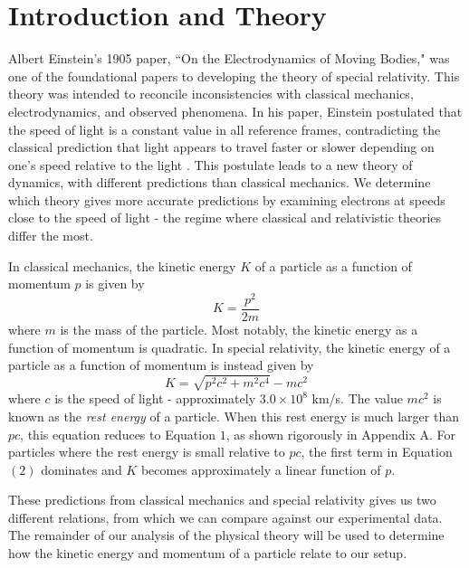 \section{Introduction and Theory}
Albert Einstein's 1905 paper, ``On the Electrodynamics of Moving Bodies," was one of the foundational papers to developing the theory of special relativity. This theory was intended to reconcile inconsistencies with classical mechanics, electrodynamics, and observed phenomena. In his paper, Einstein postulated that the speed of light is a constant value in all reference frames, contradicting the classical prediction that light appears to travel faster or slower depending on one's speed relative to the light \cite{einstein}. This postulate leads to a new theory of dynamics, with different predictions than classical mechanics. We determine which theory gives more accurate predictions by examining electrons at speeds close to the speed of light - the regime where classical and relativistic theories differ the most.

In classical mechanics, the kinetic energy $K$ of a particle as a function of momentum $p$ is given by
\begin{equation}
  K = \frac{p^2}{2m}
\end{equation}
where $m$ is the mass of the particle. Most notably, the kinetic energy as a function of momentum is quadratic.
In special relativity, the kinetic energy of a particle as a function of momentum is instead given by
\begin{equation}
  K = \sqrt{p^2 c^2 + m^2c^4} - mc^2
\end{equation}
where $c$ is the speed of light - approximately $3.0 \times 10^{8}$ km/s. The value $mc^2$ is known as the \textit{rest energy} of a particle. When this rest energy is much larger than $pc$, this equation reduces to Equation $1$, as shown rigorously in Appendix A. For particles where the rest energy is small relative to $pc$, the first term in Equation $(2)$ dominates and $K$ becomes approximately a linear function of $p$. 

These predictions from classical mechanics and special relativity gives us two different relations, from which we can compare against our experimental data. The remainder of our analysis of the physical theory will be used to determine how the kinetic energy and momentum of a particle relate to our setup.

